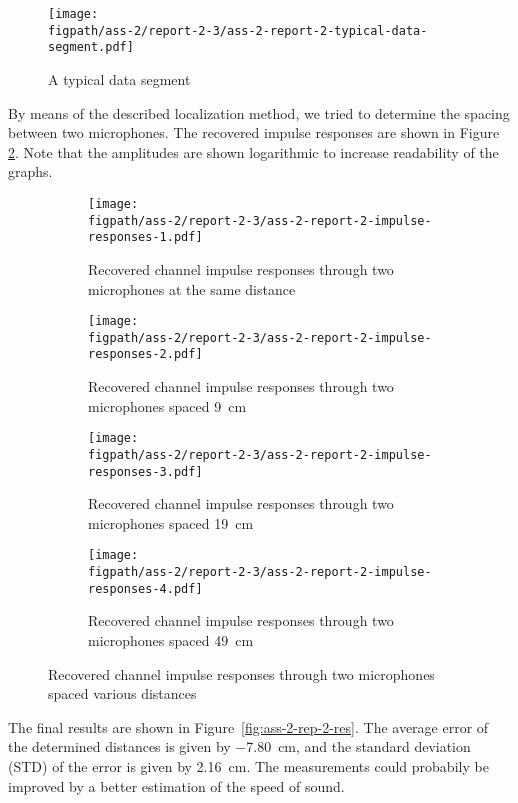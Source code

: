 \documentclass[11pt,titlepage]{report}
\newcommand{\figpath}{../../deliverable-7-resources/figures}
\begin{document}
\begin{figure}[H]
	\begin{center}
		\texttt{[image: \\figpath/ass-2/report-2-3/ass-2-report-2-typical-data-segment.pdf]}
	\end{center}
	\caption{A typical data segment}
	\label{fig:ass-2-rep-2-typical}
\end{figure}

By means of the described localization method, we tried to determine the spacing between two microphones. The recovered impulse responses are shown in Figure \ref{fig:ass-2-rep-2-imps}. Note that the amplitudes are shown logarithmic to increase readability of the graphs.

\begin{figure}[H]
	\centering
	\begin{subfigure}{.49\textwidth}
		\texttt{[image: \\figpath/ass-2/report-2-3/ass-2-report-2-impulse-responses-1.pdf]}
		\caption{\centering Recovered channel impulse responses through two microphones at the same distance}
	\end{subfigure}
	\begin{subfigure}{.49\textwidth}
		\texttt{[image: \\figpath/ass-2/report-2-3/ass-2-report-2-impulse-responses-2.pdf]}
		\caption{\centering Recovered channel impulse responses through two microphones spaced \SI{9}{cm}}
	\end{subfigure}
	\begin{subfigure}{.49\textwidth}
		\texttt{[image: \\figpath/ass-2/report-2-3/ass-2-report-2-impulse-responses-3.pdf]}
		\caption{\centering Recovered channel impulse responses through two microphones spaced \SI{19}{cm}}
	\end{subfigure}
	\begin{subfigure}{.49\textwidth}
		\texttt{[image: \\figpath/ass-2/report-2-3/ass-2-report-2-impulse-responses-4.pdf]}
		\caption{\centering Recovered channel impulse responses through two microphones spaced \SI{49}{cm}}
	\end{subfigure}
	\caption{Recovered channel impulse responses through two microphones spaced various distances}
	\label{fig:ass-2-rep-2-imps}
\end{figure}

The final results are shown in Figure~\ref{fig:ass-2-rep-2-res}. The average error of the determined distances is given by \SI{-7.80}{cm}, and the standard deviation (STD) of the error is given by \SI{2.16}{cm}. The measurements could probabily be improved by a better estimation of the speed of sound.
\end{document}
